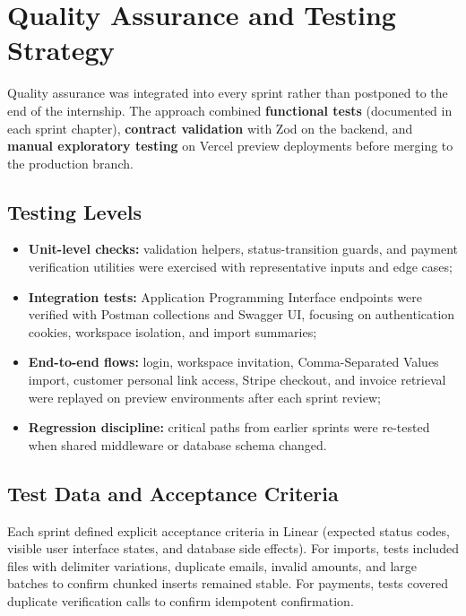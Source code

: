 ﻿\documentclass[12pt,a4paper]{report}
\begin{document}
\section{Quality Assurance and Testing Strategy}
\label{sec:qa}

Quality assurance was integrated into every sprint rather than postponed to the end
of the internship.
The approach combined \textbf{functional tests} (documented in each sprint chapter),
\textbf{contract validation} with Zod on the backend, and \textbf{manual exploratory
testing} on Vercel preview deployments before merging to the production branch.

\subsection{Testing Levels}

\begin{itemize}
  \item \textbf{Unit-level checks:} validation helpers, status-transition guards, and
        payment verification utilities were exercised with representative inputs and edge cases;
  \item \textbf{Integration tests:} Application Programming Interface endpoints were verified
        with Postman collections and Swagger UI, focusing on authentication cookies, workspace
        isolation, and import summaries;
  \item \textbf{End-to-end flows:} login, workspace invitation, Comma-Separated Values import,
        customer personal link access, Stripe checkout, and invoice retrieval were replayed on
        preview environments after each sprint review;
  \item \textbf{Regression discipline:} critical paths from earlier sprints were re-tested when
        shared middleware or database schema changed.
\end{itemize}

\subsection{Test Data and Acceptance Criteria}

Each sprint defined explicit acceptance criteria in Linear (expected status codes, visible
user interface states, and database side effects).
For imports, tests included files with delimiter variations, duplicate emails, invalid amounts,
and large batches to confirm chunked inserts remained stable.
For payments, tests covered duplicate verification calls to confirm idempotent confirmation.
\end{document}

